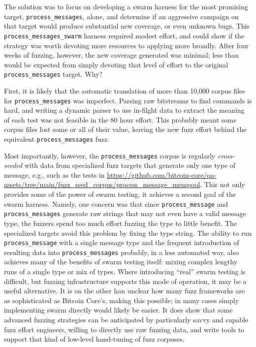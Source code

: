 \begin{sloppypar}
The solution was to focus on developing a swarm harness for the most promising target, {\tt process\_messages}, alone, and determine if an aggressive campaign on that target would produce substantial new coverage, or even unknown bugs. This {\tt process\_messages\_swarm} harness required modest effort, and could show if the strategy was worth devoting more resources to applying more broadly.  After four weeks of fuzzing, however, the new coverage generated was minimal; less than would be expected from simply devoting that level of effort to the original {\tt process\_messages} target.  Why?

First, it is likely that the automatic translation of more than 10,000 corpus files for {\tt process\_messages} was imperfect.  Parsing raw bitstreams to find commands is hard, and writing a dynamic parser to use in-filght data to extract the meaning of each test was not feasible in the 80 hour effort.  This probably meant some corpus files lost some or all of their value, leaving the new fuzz effort behind the equivalent {\tt process\_messages} fuzz.

Most importantly, however, the {\tt process\_messages} corpus is regularly \emph{cross-seeded} with data from specialized fuzz targets that generate only one type of message, e.g., such as the tests in \url{https://github.com/bitcoin-core/qa-assets/tree/main/fuzz_seed_corpus/process\_message\_mempool}.  This not only provides some of the power of swarm testing, it achieves a second goal of the swarm harness.  Namely, one concern was that since {\tt process\_message} and {\tt process\_messages} generate raw strings that may not even have a valid message type,  the fuzzers spend too much effort fuzzing the type to little benefit.  The specialized targets avoid this problem by fixing the type string.  The ability to run {\tt process\_message} with a single message type and the frequent introduction of resulting data into {\tt process\_messages} probably, in a less automated way, also  achieves many of the benefits of swarm testing itself:  mixing complex lengthy runs of a single type or mix of types.  Where introducing ``real'' swarm testing is difficult, but fuzzing infrastructure supports this mode of operation, it may be a useful alternative.  It is on the other han unclear how many fuzz frameworks are as sophisticated as Bitcoin Core's, making this possible; in many cases simply implementing swarm directly would likely be easier.  It does show that some advanced fuzzing strategies can be anticipated by particularly savvy and capable fuzz effort engineers, willing to directly use raw fuzzing data, and write tools to support that kind of low-level hand-tuning of fuzz corpuses.

\end{sloppypar}